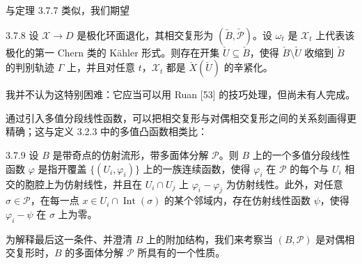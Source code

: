 与定理 3.7.7 类似，我们期望

\begin{conjecture}{3.7.8}
设 $\mathcal X\to D$ 是极化环面退化，其相交复形为 $(\check B,\check{\mathcal P})$。设 $\omega_t$ 是 $\mathcal X_t$ 上代表该极化的第一 Chern 类的 Kähler 形式。则存在开集 $\check U\subseteq\check B$，使得 $\check B\setminus\check U$ 收缩到 $\check B$ 的判别轨迹 $\Gamma$ 上，并且对任意 $t$，$\mathcal X_t$ 都是 $\check X(\check U)$ 的辛紧化。
\end{conjecture}

我并不认为这特别困难：它应当可以用 Ruan [53] 的技巧处理，但尚未有人完成。

通过引入多值分段线性函数，可以把相交复形与对偶相交复形之间的关系刻画得更精确；这与定义 3.2.3 中的多值凸函数相类比：

\begin{definition}{3.7.9}
设 $B$ 是带奇点的仿射流形，带多面体分解 $\mathcal P$。则 $B$ 上的一个多值分段线性函数 $\varphi$ 是指开覆盖 $\{(U_i,\varphi_i)\}$ 上的一族连续函数，使得 $\varphi_i$ 在 $\mathcal P$ 的每个与 $U_i$ 相交的胞腔上为仿射线性，并且在 $U_i\cap U_j$ 上 $\varphi_i-\varphi_j$ 为仿射线性。此外，对任意 $\sigma\in\mathcal P$，在每一点 $x\in U_i\cap\operatorname{Int}(\sigma)$ 的某个邻域内，存在仿射线性函数 $\psi$，使得 $\varphi_i-\psi$ 在 $\sigma$ 上为零。
\end{definition}

为解释最后这一条件、并澄清 $B$ 上的附加结构，我们来考察当 $(B,\mathcal P)$ 是对偶相交复形时，$B$ 的多面体分解 $\mathcal P$ 所具有的一个性质。

